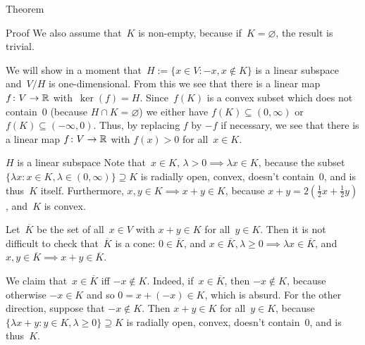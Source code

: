 \documentclass[a]{subfiles}
\begin{document}
\begin{parsec}
\begin{point}{Theorem}
\begin{point}{Proof}
We also assume that~$K$ is non-empty,
because if~$K=\varnothing$, the result is trivial.

We will show in a moment that~$H:=\{x\in V\colon -x,x\notin K\}$
is a linear subspace and~$V/H$ is one-dimensional.
From this we see that there is a linear map $f\colon V\to\mathbb{R}$
with~$\ker(f)=H$.
Since~$f(K)$ is a convex subset which does not contain~$0$
(because $H\cap K=\varnothing$)
we either have $f(K)\subseteq (0,\infty)$
or $f(K)\subseteq(-\infty,0)$.
Thus, by replacing $f$ by $-f$ if necessary,
we see that there is a linear map $f\colon V\to \mathbb{R}$
with $f(x)>0$ for all~$x\in K$.
\begin{point}{$H$ is a linear subspace}%
Note that~$x\in K,\,\lambda>0\implies \lambda x\in K$,
because the subset 
$\{\lambda x\colon x\in K,\lambda\in(0,\infty)\}\supseteq K$
is radially open, convex, doesn't contain~$0$,
and is thus~$K$ itself.
Furthermore,
$x,y\in K\implies x+y\in K$, because
$x+y=2(\frac{1}{2}x + \frac{1}{2}y)$, and~$K$ is convex.

Let~$\overline{K}$ be the set of all~$x\in V$
with $x+y\in K$ for all~$y\in K$.
Then it is not difficult to check that~$\overline{K}$ is a cone:
 $0\in\overline{K}$,
and
$x\in \overline{K},\lambda\geq 0\implies \lambda x\in \overline{K}$, and
$x,y\in\overline{K}\implies x+y\in \overline{K}$.

We claim that~$x\in \overline{K}$ iff $-x\notin K$.
Indeed, if~$x\in\overline{K}$, then $-x\notin K$, because otherwise
$-x\in K$ and so
$0=x+(-x)\in K$, which is absurd.
For the other direction, suppose that $-x\notin K$.
Then $x+y\in K$ for all~$y\in K$,
because
$\{\lambda x+y\colon y\in K,\lambda\geq0\}\supseteq K$
is radially open, convex, doesn't contain~$0$,
and is thus~$K$.


\end{point}
\end{point}
\end{point}
\end{parsec}
\end{document}
